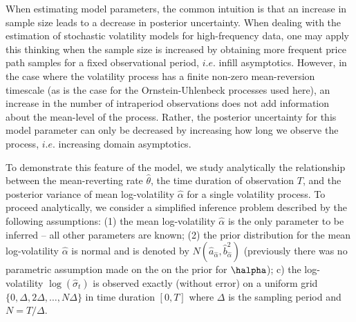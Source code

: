 When estimating model parameters, the common intuition is that an increase in sample size leads to a decrease in posterior uncertainty. When dealing with the estimation of stochastic volatility models for high-frequency data, one may apply this thinking when the sample size is increased by obtaining more frequent price path samples for a fixed observational period, $i.e.$ infill asymptotics. However, in the case where the volatility process has a finite non-zero mean-reversion timescale (as is the case for the Ornstein-Uhlenbeck processes used here), an increase in the number of intraperiod observations does not add information about the mean-level of the process. Rather, the posterior uncertainty for this model parameter can only be decreased by increasing how long we observe the process, $i.e.$ increasing domain asymptotics.

To demonstrate this feature of the model, we study analytically the relationship between the mean-reverting rate $\hat{\theta}$, the time duration of observation $T$, and the posterior variance of mean log-volatility $\hat{\alpha}$ for a single volatility process.  To proceed analytically, we consider a simplified inference problem described by the following assumptions:  (1) the mean log-volatility $\hat{\alpha}$ is the only parameter to be inferred -- all other parameters are known; (2) the prior distribution for the mean log-volatility $\hat{\alpha}$ is normal and is denoted by $N(\hat{a}_{\hat{\alpha}}, \hat{b}^2_{\hat{\alpha}}) $ (previously there was no parametric assumption made on the on the prior for $\halpha$); c) the log-volatility $\log( \hat{ \sigma }_t)$ is observed exactly (without error) on a uniform grid $\{0, \Delta, 2\Delta, \ldots , N\Delta \} $ in time duration $[0, T]$ where $\Delta $ is the sampling period and $N=T/\Delta $.

